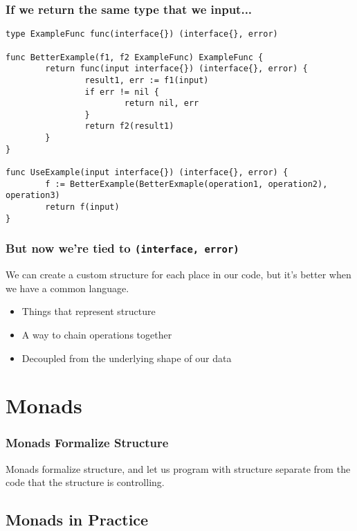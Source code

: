 \documentclass{beamer}
\begin{document}
\begin{frame}[fragile]
  \frametitle{If we return the same type that we input...}
\begin{lstlisting}
type ExampleFunc func(interface{}) (interface{}, error)

func BetterExample(f1, f2 ExampleFunc) ExampleFunc {
        return func(input interface{}) (interface{}, error) {
                result1, err := f1(input)
                if err != nil {
                        return nil, err
                }
                return f2(result1)
        }
}

func UseExample(input interface{}) (interface{}, error) {
        f := BetterExample(BetterExmaple(operation1, operation2), operation3)
        return f(input)
}
\end{lstlisting}
\end{frame}

\begin{frame}[fragile]
  \frametitle{But now we're tied to {\tt (interface{}, error)}}

  We can create a custom structure for each place in our code, but
  it's better when we have a common language.

  \begin{itemize}
  \item Things that represent structure
  \item A way to chain operations together
  \item Decoupled from the underlying shape of our data
  \end{itemize}
\end{frame}

\section{Monads}

\begin{frame}
  \frametitle{Monads Formalize Structure}

  Monads formalize structure, and let us program with structure
  separate from the code that the structure is controlling.
\end{frame}

\subsection{Monads in Practice}
\end{document}
